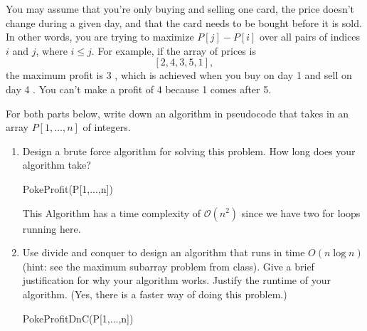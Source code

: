 \documentclass[11pt]{article}
\theoremstyle{definition}  %
\begin{document}
\begin{enumerate}
You may assume that you're only buying and selling one card, the price doesn't change during a given day, and that the card needs to be bought before it is sold. In other words, you are trying to maximize $P[j]-P[i]$ over all pairs of indices $i$ and $j$, where $i \leq j$. For example, if the array of prices is
$$
[2,4,3,5,1] \text {, }
$$
the maximum profit is 3 , which is achieved when you buy on day 1 and sell on day 4 . You can't make a profit of 4 because 1 comes after 5.

For both parts below, write down an algorithm in pseudocode that takes in an array $P[1, \ldots, n]$ of integers.
\begin{enumerate}
  \item Design a brute force algorithm for solving this problem. How long does your algorithm take?
  \begin{algorithm}
    \caption{PokeProfit(P[1,...,n]) }
    \label{alg:algorithm_sum}
    \begin{algorithmic}[1]
          \EndFor
        \EndFor
    \end{algorithmic}
  \end{algorithm}
  This Algorithm has a time complexity of $\mathcal{O}(n^2)$ since we have two for loops running here.
  \item Use divide and conquer to design an algorithm that runs in time $O(n \log n)$ (hint: see the maximum subarray problem from class). Give a brief justification for why your algorithm works. Justify the runtime of your algorithm. (Yes, there is a faster way of doing this problem.)
  \newcommand{\floor}[1]{\lfloor #1 \rfloor}
  \begin{algorithm}
    \caption{PokeProfitDnC(P[1,...,n]) }
    \label{alg:algorithm_sum}
    \begin{algorithmic}[1]
      \EndIf
      \State{y=$\floor{(n/2)}$}
    \end{algorithmic}
  \end{algorithm}
\end{enumerate}


\end{enumerate}
\end{document}
